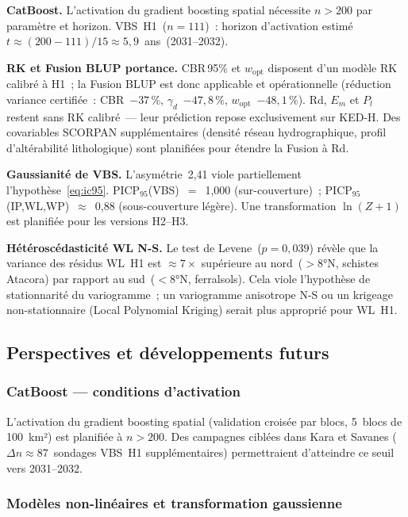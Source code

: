 \documentclass[10pt,a4paper,twocolumn]{article}
\begin{document}
	\textbf{CatBoost.}
	L'activation du gradient boosting spatial nécessite
	$n>200$ par paramètre et horizon.
	VBS~H1~($n=111$)~: horizon d'activation estimé
	$t\approx(200-111)/15\approx5{,}9$~ans~(2031--2032).
	
	\textbf{RK et Fusion BLUP portance.}
	CBR\,95\% et $w_{\mathrm{opt}}$ disposent d'un modèle RK calibré
	à H1~; la Fusion BLUP est donc applicable et opérationnelle
	(réduction variance certifiée~: CBR~$-37$\,\%,
	$\gamma_d$~$-47{,}8$\,\%, $w_{\mathrm{opt}}$~$-48{,}1$\,\%).
	Rd, $E_m$ et $P_l$ restent sans RK calibré~---
	leur prédiction repose exclusivement sur KED-H.
	Des covariables SCORPAN supplémentaires (densité réseau
	hydrographique, profil d'altérabilité lithologique)
	sont planifiées pour étendre la Fusion à Rd.
	
	\textbf{Gaussianité de VBS.}
	L'asymétrie~2{,}41 viole partiellement l'hypothèse~\eqref{eq:ic95}.
	PICP$_{95}$(VBS)~$=$~1{,}000 (sur-couverture)~;
	PICP$_{95}$(IP,WL,WP)~$\approx$~0{,}88 (sous-couverture légère).
	Une transformation $\ln(Z+1)$ est planifiée pour les versions H2--H3.

	\textbf{Hétéroscédasticité WL N-S.}
	Le test de Levene~($p=0{,}039$) révèle que la variance des résidus
	WL~H1 est $\approx7\times$ supérieure au nord~($>8°$N, schistes
	Atacora) par rapport au sud~($<8°$N, ferralsols).
	Cela viole l'hypothèse de stationnarité du variogramme~;
	un variogramme anisotrope N-S ou un krigeage non-stationnaire
	(Local Polynomial Kriging) serait plus approprié pour WL~H1.
	
	\subsection{Perspectives et développements futurs}
	\label{subsec:perspectives}
	
	\subsubsection{CatBoost --- conditions d'activation}
	
	L'activation du gradient boosting spatial (validation croisée
	par blocs, 5~blocs de 100~km²) est planifiée à $n>200$.
	Des campagnes ciblées dans Kara et Savanes
	($\Delta n\approx87$~sondages VBS~H1 supplémentaires)
	permettraient d'atteindre ce seuil vers 2031--2032.
	
	\subsubsection{Modèles non-linéaires et transformation gaussienne}
\end{document}
